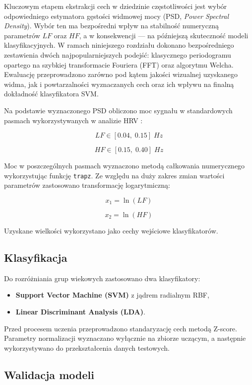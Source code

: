 \documentclass[a4paper,12pt]{article}
\begin{document}
Kluczowym etapem ekstrakcji cech w dziedzinie częstotliwości jest wybór odpowiedniego estymatora gęstości widmowej mocy (PSD, \textit{Power Spectral Density}). Wybór ten ma bezpośredni wpływ na stabilność numeryczną parametrów $LF$ oraz $HF$, a w konsekwencji --- na późniejszą skuteczność modeli klasyfikacyjnych. W ramach niniejszego rozdziału dokonano bezpośredniego zestawienia dwóch najpopularniejszych podejść: klasycznego periodogramu opartego na szybkiej transformacie Fouriera (FFT) oraz algorytmu Welcha. Ewaluację przeprowadzono zarówno pod kątem jakości wizualnej uzyskanego widma, jak i powtarzalności wyznaczanych cech oraz ich wpływu na finalną dokładność klasyfikatora SVM.

Na podstawie wyznaczonego PSD obliczono moc sygnału w standardowych pasmach wykorzystywanych w analizie HRV \cite{taskforce}:

\[
LF \in [0.04,\;0.15]\;Hz
\]

\[
HF \in [0.15,\;0.40]\;Hz
\]

Moc w poszczególnych pasmach wyznaczono metodą całkowania numerycznego wykorzystując funkcję \texttt{trapz}. Ze względu na duży zakres zmian wartości parametrów zastosowano transformację logarytmiczną:

\[
x_1 = \ln(LF)
\]

\[
x_2 = \ln(HF)
\]

Uzyskane wielkości wykorzystano jako cechy wejściowe klasyfikatorów.

\subsection{Klasyfikacja}

Do rozróżniania grup wiekowych zastosowano dwa klasyfikatory:

\begin{itemize}
\item \textbf{Support Vector Machine (SVM)} z jądrem radialnym RBF,
\item \textbf{Linear Discriminant Analysis (LDA)}.
\end{itemize}

Przed procesem uczenia przeprowadzono standaryzację cech metodą Z-score. Parametry normalizacji wyznaczano wyłącznie na zbiorze uczącym, a następnie wykorzystywano do przekształcenia danych testowych.

\subsection{Walidacja modeli}
\end{document}
